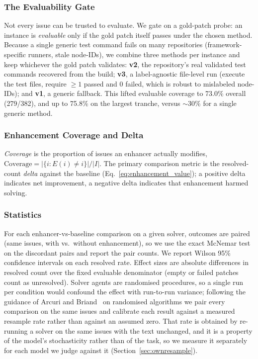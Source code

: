 \documentclass[journal]{IEEEtran}
\begin{document}
\subsubsection{The Evaluability Gate}
Not every issue can be trusted to evaluate. We gate on a gold-patch probe: an instance is \emph{evaluable} only if the gold patch itself passes under the chosen method. Because a single generic test command fails on many repositories (framework-specific runners, stale node-IDs), we combine three methods per instance and keep whichever the gold patch validates: \textbf{v2}, the repository's real validated test commands recovered from the build; \textbf{v3}, a label-agnostic file-level run (execute the test files, require $\ge 1$ passed and $0$ failed, which is robust to mislabeled node-IDs); and \textbf{v1}, a generic fallback. This lifted evaluable coverage to 73.0\% overall (279/382), and up to 75.8\% on the largest tranche, versus $\sim$30\% for a single generic method.

\subsubsection{Enhancement Coverage and Delta}
\emph{Coverage} is the proportion of issues an enhancer actually modifies, $\text{Coverage} = |\{i : E(i) \neq i\}| / |I|$. The primary comparison metric is the resolved-count \emph{delta} against the baseline (Eq.~\ref{eq:enhancement_value}); a positive delta indicates net improvement, a negative delta indicates that enhancement harmed solving.

\subsubsection{Statistics}
For each enhancer-vs-baseline comparison on a given solver, outcomes are paired (same issues, with vs.\ without enhancement), so we use the exact McNemar test on the discordant pairs and report the pair counts. We report Wilson 95\% confidence intervals on each resolved rate. Effect sizes are absolute differences in resolved count over the fixed evaluable denominator (empty or failed patches count as unresolved). Solver agents are randomised procedures, so a single run per condition would confound the effect with run-to-run variance; following the guidance of Arcuri and Briand~\cite{arcuri2014hitchhiker} on randomised algorithms we pair every comparison on the same issues and calibrate each result against a measured resample rate rather than against an assumed zero. That rate is obtained by re-running a solver on the same issues with the text unchanged, and it is a property of the model's stochasticity rather than of the task, so we measure it separately for each model we judge against it (Section~\ref{sec:ownresample}).
\end{document}
